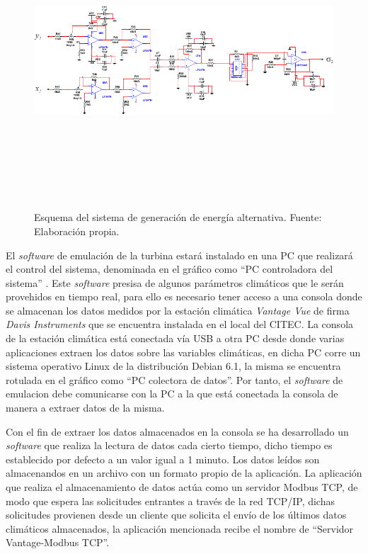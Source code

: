 \begin{figure}[h]
	\centering
		\includegraphics[height=110mm, width = 135mm]{./imagenes/plataforma08.pdf}
	\caption{Esquema del sistema de generación de energía alternativa. Fuente: Elaboración propia.}
	\label{conacyt}
\end{figure}

El \textit{software} de emulación de la turbina estará instalado en una PC que realizará el control del sistema, denominada en el gráfico como "`PC controladora del sistema"' . Este \textit{software} presisa de algunos parámetros climáticos que le serán provehidos en tiempo real, para ello es necesario tener acceso a una consola donde se almacenan los datos medidos por la estación climática \textit{Vantage Vue} de firma  \textit{Davis Instruments} que se encuentra instalada en el local del CITEC. La consola de la estación climática está conectada vía USB a otra PC desde donde varias aplicaciones extraen los datos sobre las variables climáticas, en dicha PC corre un sistema operativo Linux de la distribución Debian 6.1, la misma se encuentra rotulada en el gráfico como "`PC colectora de datos"'. Por tanto, el \textit{software} de emulacion debe comunicarse con la PC a la que está conectada la consola de manera a extraer datos de la misma.

Con el fin de extraer los datos almacenados en la consola se ha desarrollado un \textit{software} que realiza la lectura de datos cada cierto tiempo, dicho tiempo es establecido por defecto a un valor igual a 1 minuto. Los datos leídos son almacenandos en un archivo con un formato propio de la aplicación. La aplicación que realiza el almacenamiento de datos actúa como un servidor Modbus TCP, de modo que espera las solicitudes entrantes a través de la red TCP/IP, dichas solicitudes provienen desde un cliente que solicita el envío de los últimos datos climáticos almacenados, la aplicación mencionada recibe el nombre de "`Servidor Vantage-Modbus TCP"'.

